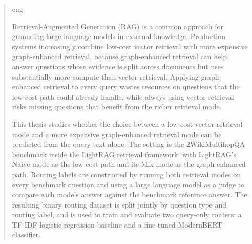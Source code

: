 \documentclass[english, bibtex]{kththesis}               %
\newcommand*{\generalExpl}[1]{\todo[inline]{#1}}
\newcommand*{\engExpl}[1]{\todo[inline, backgroundcolor=kth-lightgreen40]{#1}} %
\renewcommand\generalExpl[1]{}
\renewcommand\engExpl[1]{}
\numberwithin{listing}{chapter}
\begin{document}
\begin{abstract}
  \markboth{\abstractname}{}
\begin{scontents}[store-env=lang]
eng
\end{scontents}
\engExpl{All theses at KTH are \textbf{required} to have an abstract in both \textit{English} and \textit{Swedish}.}

\engExpl{Exchange students may want to include one or more abstracts in the language(s) used in their home institutions to avoid the need to write another thesis when returning to their home institution.}

\generalExpl{Keep in mind that most of your potential readers are only going to read your \texttt{title} and \texttt{abstract}. This is why the abstract must give them enough information so that they can decide if this document is relevant to them or not. Otherwise, the likely default choice is to ignore the rest of your document.\\
An abstract should stand on its own, \ie no citations, cross-references to the body of the document, acronyms must be spelled out, \ldots .\\Write this early and revise as necessary. This will help keep you focused on what you are trying to do.}

\begin{scontents}[store-env=abstracts,print-env=true]
Retrieval-Augmented Generation (RAG) is a common approach for grounding large language models in external knowledge. Production systems increasingly combine low-cost vector retrieval with more expensive graph-enhanced retrieval, because graph-enhanced retrieval can help answer questions whose evidence is split across documents but uses substantially more compute than vector retrieval. Applying graph-enhanced retrieval to every query wastes resources on questions that the low-cost path could already handle, while always using vector retrieval risks missing questions that benefit from the richer retrieval mode.

This thesis studies whether the choice between a low-cost vector retrieval mode and a more expensive graph-enhanced retrieval mode can be predicted from the query text alone. The setting is the 2WikiMultihopQA benchmark inside the LightRAG retrieval framework, with LightRAG's Naive mode as the low-cost path and its Mix mode as the graph-enhanced path. Routing labels are constructed by running both retrieval modes on every benchmark question and using a large language model as a judge to compare each mode's answer against the benchmark reference answer. The resulting binary routing dataset is split jointly by question type and routing label, and is used to train and evaluate two query-only routers: a TF-IDF logistic-regression baseline and a fine-tuned ModernBERT classifier.


\end{scontents}
\end{abstract}
\end{document}

